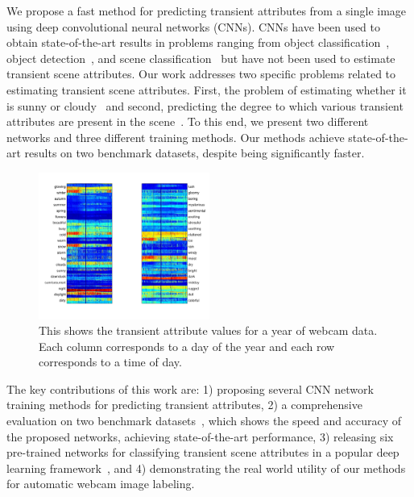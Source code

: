 \documentclass[10pt,twocolumn,letterpaper]{article}
\newcommand{\todo}[1]{\textcolor{red}{todo: {\em #1}}}
\newcommand{\figref}[1]{Figure~\ref{fig:#1}}
\begin{document}

We propose a fast method for predicting transient attributes from a single image
using deep convolutional neural networks (CNNs). CNNs have been used to
obtain state-of-the-art results in problems ranging from object
classification~\cite{krizhevsky2012imagenet}, object
detection~\cite{girshick2013rich}, and scene
classification~\cite{zhou2014places} but have not been used to estimate
transient scene attributes. Our work addresses two specific problems
related to estimating transient scene attributes. First, the problem of
estimating whether it is sunny or cloudy~\cite{lutwoclass} and second,
predicting the degree to which various transient attributes are
present in the scene~\cite{Laffont14}. To this end, we present two
different networks and three different training methods. Our methods
achieve state-of-the-art results on two benchmark datasets, despite
being significantly faster. 

\begin{figure}[t]
	\centering
		\includegraphics[width=0.5\textwidth, trim= 5mm 15mm 0mm 10mm]{figs/summary_260.pdf}
		\caption{This shows the transient attribute values for a year of webcam 
             data.  Each column corresponds to a day of the year and each row
             corresponds to a time of day.}
		\label{fig:webcam_summary}
\end{figure}



The key contributions of this work are: 1) proposing several CNN
network training methods for predicting transient attributes, 2) a
comprehensive evaluation on two benchmark
datasets~\cite{lutwoclass,Laffont14}, which shows the speed and
accuracy of the proposed networks, achieving state-of-the-art
performance, 3) releasing six pre-trained networks for classifying
transient scene attributes in a popular deep learning
framework~\cite{caffe14}, and 4) demonstrating the real world utility
of our methods for automatic webcam image labeling. 
\end{document}
